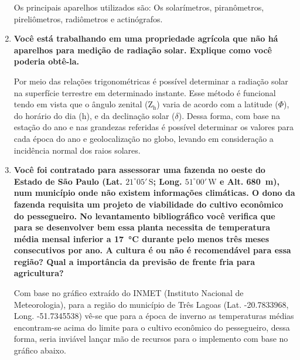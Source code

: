 \documentclass[a4paper, 12pt]{article}
\newcommand{\tbf}[1]{\textbf{#1}}
\begin{document}
\begin{enumerate}
		Os principais aparelhos utilizados são: Os solarímetros, piranômetros, pireliômetros, radiômetros e actinógrafos.
		
		\item\tbf{Você está trabalhando em uma propriedade agrícola que não há aparelhos para medição de radiação solar. Explique como você poderia obtê-la.}
		
		Por meio das relações trigonométricas é possível determinar a radiação solar na superfície terrestre em determinado instante. Esse método é funcional tendo em vista que o ângulo zenital ($\textrm{Z}_{\text{h}}$) varia de acordo com a latitude ($\Phi$), do horário do dia (h), e da declinação solar ($\delta$). Dessa forma, com base na estação do ano e nas grandezas referidas é possível determinar os valores para cada época do ano e geolocalização no globo, levando em consideração a incidência normal dos raios solares.
		
		\item\tbf{Você foi contratado para assessorar uma fazenda no oeste do Estado de São Paulo (Lat. $21^{\circ}05'\,\textrm{S}$; Long. $51^{\circ}00'\,\textrm{W}$ e Alt. \SI{680}{\meter}), num município onde não existem informações climáticas. O dono da fazenda requisita um projeto de viabilidade do cultivo econômico do pessegueiro. No levantamento bibliográfico você verifica que para se desenvolver bem essa planta necessita de temperatura média mensal inferior a \SI{17}{\celsius} durante pelo menos três meses consecutivos por ano. A cultura é ou não é recomendável para essa região? Qual a importância da previsão de frente fria para agricultura?}
		
		Com base no gráfico extraído do INMET (Instituto Nacional de Meteorologia), para a região do município de Três Lagoas (Lat. -20.7833968, Long. -51.7345538) vê-se que para a época de inverno as temperaturas médias encontram-se acima do limite para o cultivo econômico do pessegueiro, dessa forma, seria inviável lançar mão de recursos para o implemento com base no gráfico abaixo.
		

\end{enumerate}
\end{document}
